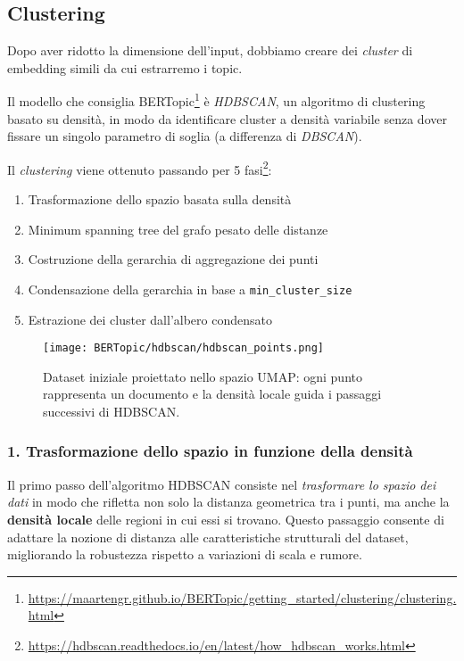 \subsection{Clustering}
\noindent Dopo aver ridotto la dimensione dell'input, dobbiamo creare dei \textit{cluster} di embedding simili da cui estrarremo i topic.

\noindent Il modello che consiglia BERTopic\footnote{\url{https://maartengr.github.io/BERTopic/getting_started/clustering/clustering.html}} è \textit{HDBSCAN}, un algoritmo di clustering basato su densità, in modo da identificare cluster a densità variabile senza dover fissare un singolo parametro di soglia (a differenza di \textit{DBSCAN}).

\noindent Il \textit{clustering} viene ottenuto passando per 5 fasi\footnote{\url{https://hdbscan.readthedocs.io/en/latest/how_hdbscan_works.html}}:
\begin{enumerate}
    \item Trasformazione dello spazio basata sulla densità
    \item Minimum spanning tree del grafo pesato delle distanze
    \item Costruzione della gerarchia di aggregazione dei punti
    \item Condensazione della gerarchia in base a \texttt{min\_cluster\_size}
    \item Estrazione dei cluster dall'albero condensato
\end{enumerate}

\begin{figure}[H]
\centering
\texttt{[image: BERTopic/hdbscan/hdbscan\_points.png]}
\caption{Dataset iniziale proiettato nello spazio UMAP: ogni punto rappresenta un documento e la densità locale guida i passaggi successivi di HDBSCAN.}
\label{fig:hdbscan-points}
\end{figure}
\subsubsection*{1. Trasformazione dello spazio in funzione della densità}

Il primo passo dell'algoritmo HDBSCAN consiste nel \textit{trasformare lo spazio dei dati} in modo che rifletta non solo la distanza geometrica tra i punti, ma anche la \textbf{densità locale} delle regioni in cui essi si trovano. 
Questo passaggio consente di adattare la nozione di distanza alle caratteristiche strutturali del dataset, migliorando la robustezza rispetto a variazioni di scala e rumore.

